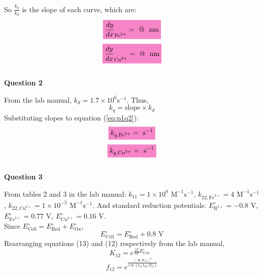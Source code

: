 So $\frac{k_q}{k_d}$ is the slope of each curve, which are:
\begin{equation*}
    \mathcolorbox{Lavender}{\frac{dy}{dx}_{\text{Fe}^{3+}} =  \text{ @ }  \text{ nm} }
\end{equation*}
\begin{equation*}
    \mathcolorbox{Lavender}{\frac{dy}{dx}_{\text{Cu}^{2+}} =  \text{ @ }  \text{ nm} }
\end{equation*}
\\
\textbf{Question 2}
\par From the lab manual\autocite{lab_manual}, $k_d = 1.7 \times 10^6\text {s}^{-1}$. Thus,
\begin{equation}
    k_q = \text{slope} \times k_d
    \label{eq:p1q2}
\end{equation}
Substituting slopes to equation (\ref{eq:p1q2}):
\begin{equation*}
    \mathcolorbox{Lavender}{k_{q,\text{Fe}^{3+}} =  \text{ s}^{-1}}
\end{equation*}
\begin{equation*}
    \mathcolorbox{Lavender}{k_{q,\text{Cu}^{2+}} =  \text{ s}^{-1}}
\end{equation*}
\\
\textbf{Question 3}
\par From tables 2 and 3 in the lab manual\autocite{lab_manual}:
   $ k_{11} = 1 \times 10 ^ 8 \text{ M}^{-1}\text{s}^{-1}$, 
    $k_{22, \text{Fe}^{3+}} = 4 \text{ M}^{-1}\text{s}^{-1}$, 
    $k_{22, \text{Cu}^{2+}} = 1 \times 10 ^ {-5} \text{ M}^{-1}\text{s}^{-1}$. And standard reduction potentials: $E^{\circ}_{\text{R}^{3+}} = -0.8 \text{ V}$, $E^{\circ}_{\text{Fe}^{3+}} = 0.77 \text{ V}$, $E^{\circ}_{\text{Cu}^{2+}} = 0.16 \text{ V}$.
\\ Since $E^{\circ}_{\text{Cell}} = E^{\circ}_{\text{Red}} + E^{\circ}_{\text{Ox}}$, 
\begin{equation}
    E^{\circ}_{\text{Cell}} = E^{\circ}_{\text{Red}} + 0.8 \text{ V}
    \label{eq:ecell}
\end{equation}
Rearranging equations (13) and (12) respectively from the lab manual\autocite{lab_manual},
\begin{equation}
    K_{12} = e^{\frac{zF}{RT}E^{\circ}_{\text{Cell}}} \text{ } 
    \label{eq:K12}
\end{equation}
\begin{equation}
    f_{12} = e^{\frac{(\ln{K_{12}})^2}{4\ln{(k_{11}k_{22} / Z_{12}^2)}}}
    \label{eq:f12}
\end{equation}
